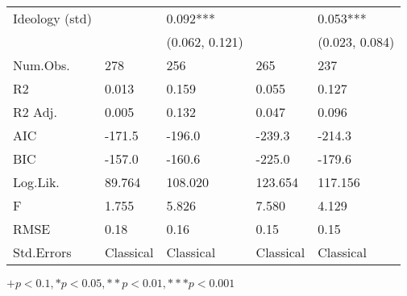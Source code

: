 \begin{table}[th!]
\begin{threeparttable}
\begin{tabular}{lC{3cm}C{3cm}C{3cm}C{3cm}}
 Ideology (std) &                 &                0.092*** &                 &                 0.053*** \\
                &                 &          (0.062, 0.121) &                 &           (0.023, 0.084) \\
       Num.Obs. &             278 &                     256 &             265 &                      237 \\
             R2 &           0.013 &                   0.159 &           0.055 &                    0.127 \\
        R2 Adj. &           0.005 &                   0.132 &           0.047 &                    0.096 \\
            AIC &          -171.5 &                  -196.0 &          -239.3 &                   -214.3 \\
            BIC &          -157.0 &                  -160.6 &          -225.0 &                   -179.6 \\
       Log.Lik. &          89.764 &                 108.020 &         123.654 &                  117.156 \\
              F &           1.755 &                   5.826 &           7.580 &                    4.129 \\
           RMSE &            0.18 &                    0.16 &            0.15 &                     0.15 \\
     Std.Errors &       Classical &               Classical &       Classical &                Classical \\
\bottomrule
\end{tabular}
\begin{tablenotes}
\item \footnotesize $+ p < 0.1, * p < 0.05, ** p < 0.01, *** p < 0.001$
\end{tablenotes}
\end{threeparttable}
\end{table}
